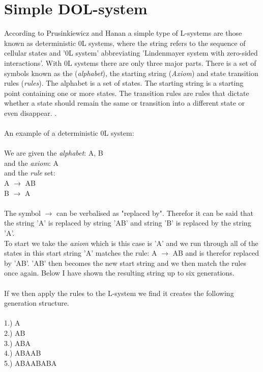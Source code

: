\section{Simple DOL-system}

According to Prusinkiewicz and Hanan a simple type of L-systems are those known as deterministic 0L systems, where the string refers to the sequence of cellular states and '0L system' abbreviating 'Lindenmayer system with zero-sided interactions'.  With 0L systems there are only three major parts. There is a set of symbols known as the (\textit{alphabet}), the starting string (\textit{Axiom}) and state transition rules (\textit{rules}). The alphabet is a set of states. The starting string is a starting point containing one or more states. The transition rules are rules that dictate whether a state should remain the same or transition into a different state or even disappear. \cite{prusinkiewicz2013lindenmayer}. \\
\\
An example of a deterministic 0L system: \\
\\
We are given the \textit{alphabet}: A, B \\ 
and the \textit{axiom}: A \\
and the \textit{rule} set: \\ 
A $\rightarrow$ AB \\
B $\rightarrow$ A \\
\\
The symbol $\rightarrow$ can be verbalised as "replaced by". Therefor it can be said that the string 'A' is replaced by string 'AB' and string 'B' is replaced by the string 'A'.\\
To start we take the \textit{axiom} which is this case is 'A' and we run through all of the states in this start string 'A' matches the rule: A $\rightarrow$ AB and is therefor replaced by 'AB'. 'AB' then becomes the new start string and we then match the rules once again. Below I have shown the resulting string up to six generations.\\
\\
If we then apply the rules to the L-system we find it creates the following generation structure. \\
\\
1.) A \\
2.) AB \\
3.) ABA \\
4.) ABAAB \\
5.) ABAABABA \\
